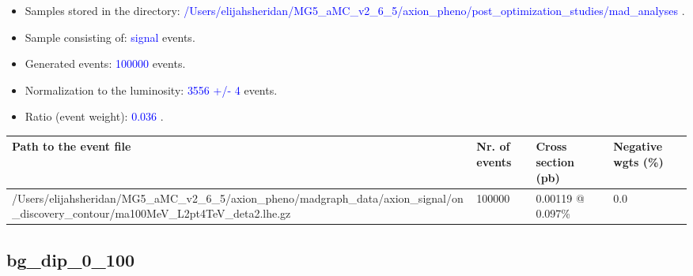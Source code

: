 \documentclass[a4paper, 10pt]{article}
\begin{document}
\begin{itemize}
  \item Samples stored in the directory: \textcolor{blue}{/\-Users/\-elijahsheridan/\-MG5\_aMC\_v2\_6\_5/\-axion\_pheno/\-post\_optimization\_studies/\-mad\_analyses} .
   \item Sample consisting of: \textcolor{blue}{signal}  events.
   \item Generated events: \textcolor{blue}{100000 }  events.
   \item Normalization to the luminosity: \textcolor{blue}{3556}\textcolor{blue}{ +/\-- }\textcolor{blue}{4 }  events.
   \item Ratio (event weight): \textcolor{blue}{0.036 } .  
 
\end{itemize}
\begin{table}[H]
  \begin{center}
    \begin{tabular}{|m{55.0mm}|m{25.0mm}|m{30.0mm}|m{30.0mm}|}
      \hline
      {\cellcolor{yellow}         Path to the event file}& {\cellcolor{yellow}         Nr. of events}& {\cellcolor{yellow}         Cross section (pb)}& {\cellcolor{yellow}         Negative wgts (\%)}\\
      \hline
      {\cellcolor{white}          /\-Users/\-elijahsheridan/\-MG5\_aMC\_v2\_6\_5/\-axion\_pheno/\-madgraph\_data/\-axion\_signal/\-on\_discovery\_contour/\-ma100MeV\_L2pt4TeV\_deta2.lhe.gz}& {\cellcolor{white}          100000}& {\cellcolor{white}          0.00119 @ 0.097\%}& {\cellcolor{white}          0.0}\\
\hline
    \end{tabular}
  \end{center}
\end{table}

\subsection{ bg\_dip\_0\_100}
\end{document}
